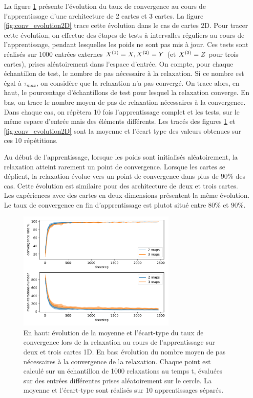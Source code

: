 La figure \ref{fig:conv_evolution} présente l'évolution du taux de convergence au cours de l'apprentissage d'une architecture de 2 cartes et 3 cartes. La figure \ref{fig:conv_evolution2D} trace  cette évolution dans le cas de cartes 2D. Pour tracer cette évolution, on effectue des étapes de tests à intervalles réguliers au cours de l'apprentissage, pendant lesquelles les poids ne sont pas mis à jour. Ces tests sont réalisés sur 1000 entrées externes $X^{({1})} = X, X^{({2})}=Y$ (et $X^{({3})}=Z$ pour trois cartes), prises aléatoirement dans l'espace d'entrée. On compte, pour chaque échantillon de test, le nombre de pas nécessaire à la relaxation. Si ce nombre est égal à $\tau_{max}$, on considère que la relaxation n'a pas convergé. On trace alors, en haut, le pourcentage d'échantillons de test pour lesquel la relaxation converge. En bas, on trace le nombre moyen de pas de relaxation nécessaires à la convergence.
Dans chaque cas, on répètera 10 fois l'apprentissage complet et les tests, sur le même espace d'entrée mais des éléments différents. Les tracés des figures \ref{fig:conv_evolution} et \ref{fig:conv_evolution2D} sont la moyenne et l'écart type des valeurs obtenues sur ces 10 répétitions.

Au début de l'apprentissage, lorsque les poids sont initialisés aléatoirement, la relaxation atteint rarement un point de convergence. Lorsque les cartes se déplient, la relaxation évolue vers un point de convergence dans plus de $90 \%$ des cas. Cette évolution est similaire pour des architecture de deux et trois cartes. Les expériences avec des cartes en deux dimensions présentent la même évolution. Le taux de convergence en fin d'apprentissage est plutot situé entre $80 \%$ et $90 \%$.
 
\begin{figure}
\centering
\includegraphics[width=0.7\textwidth]{1D_conv_evolution_total.pdf}
\caption{En haut: évolution de la moyenne et l'écart-type du taux de convergence lors de la relaxation au cours de l'apprentissage sur deux et trois cartes 1D. En bas: évolution du nombre moyen de pas nécessaires à la convergence de la relaxation.
Chaque point est calculé sur un échantillon de 1000 relaxations au temps t, évaluées sur des entrées différentes prises aléatoirement sur le cercle. La moyenne et l'écart-type sont réalisés sur 10 apprentissages séparés.}
\label{fig:conv_evolution}
\end{figure}


